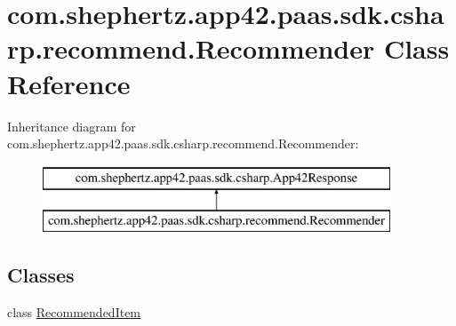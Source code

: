 \hypertarget{classcom_1_1shephertz_1_1app42_1_1paas_1_1sdk_1_1csharp_1_1recommend_1_1_recommender}{\section{com.\+shephertz.\+app42.\+paas.\+sdk.\+csharp.\+recommend.\+Recommender Class Reference}
\label{classcom_1_1shephertz_1_1app42_1_1paas_1_1sdk_1_1csharp_1_1recommend_1_1_recommender}
}
Inheritance diagram for com.\+shephertz.\+app42.\+paas.\+sdk.\+csharp.\+recommend.\+Recommender\+:\begin{figure}[H]
\begin{center}
\leavevmode
\includegraphics[height=2.000000cm]{classcom_1_1shephertz_1_1app42_1_1paas_1_1sdk_1_1csharp_1_1recommend_1_1_recommender}
\end{center}
\end{figure}
\subsection*{Classes}
\begin{DoxyCompactItemize}
\item 
class \hyperlink{classcom_1_1shephertz_1_1app42_1_1paas_1_1sdk_1_1csharp_1_1recommend_1_1_recommender_1_1_recommended_item}{Recommended\+Item}
\end{DoxyCompactItemize}
